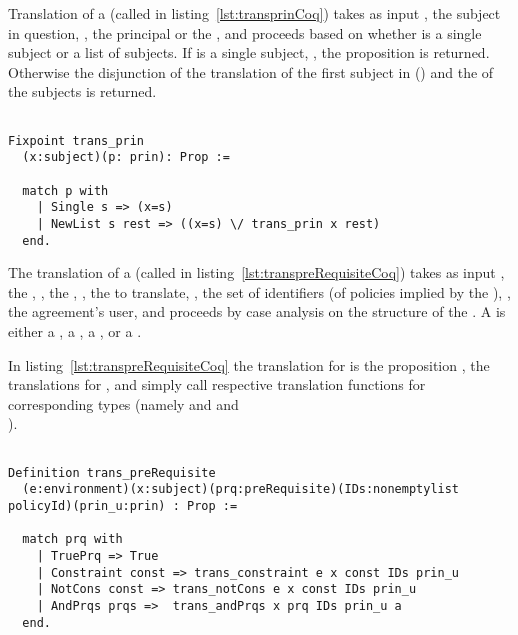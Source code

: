 Translation of a  (called  in listing~\ref{lst:transprinCoq}) takes as input , the subject in question, , the principal or the ,  and proceeds based on whether  is a single subject or a list of subjects. If  is a single subject, , the proposition  is returned. Otherwise the disjunction of the translation of the first subject in  () and the  of the subjects is returned.

\begin{lstlisting}

Fixpoint trans_prin
  (x:subject)(p: prin): Prop :=

  match p with
    | Single s => (x=s)
    | NewList s rest => ((x=s) \/ trans_prin x rest)
  end.
\end{lstlisting}



The translation of a  (called  in listing~\ref{lst:transpreRequisiteCoq}) takes as input , the , , the , , the  to translate, , the set of identifiers (of policies implied by the ), , the agreement's user, and proceeds by case analysis on the structure of the . A  is either a , a , a , or a . 

In listing~\ref{lst:transpreRequisiteCoq} the translation for  is the proposition , the translations for ,  and  simply call respective translation functions for corresponding types  (namely  and  and \\ ). 


\begin{minipage}[c]{0.95\textwidth}
\begin{lstlisting}

Definition trans_preRequisite
  (e:environment)(x:subject)(prq:preRequisite)(IDs:nonemptylist policyId)(prin_u:prin) : Prop := 

  match prq with
    | TruePrq => True
    | Constraint const => trans_constraint e x const IDs prin_u  
    | NotCons const => trans_notCons e x const IDs prin_u 
    | AndPrqs prqs =>  trans_andPrqs x prq IDs prin_u a
  end.
\end{lstlisting}
\end{minipage}

